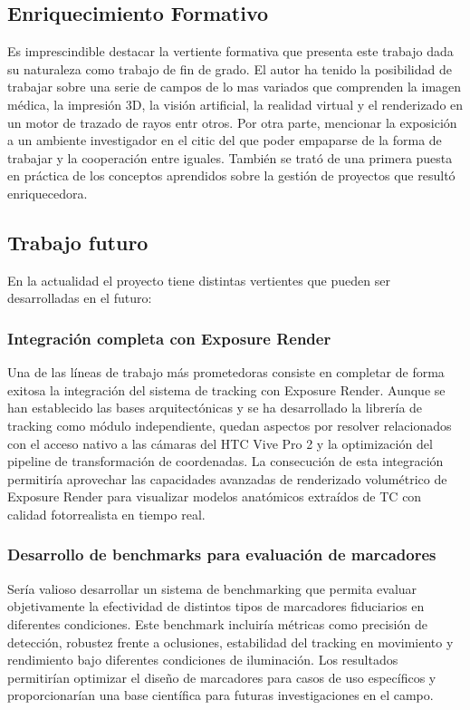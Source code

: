 \subsection{Enriquecimiento Formativo}
Es imprescindible destacar la vertiente formativa que presenta este trabajo dada su naturaleza como trabajo de fin de grado. El autor ha tenido la posibilidad de trabajar sobre una serie de campos de lo mas variados que comprenden la imagen médica, la impresión 3D, la visión artificial, la realidad virtual y el renderizado en un motor de trazado de rayos entr otros. Por otra parte, mencionar la exposición a un ambiente investigador en el \acrshort{citic} del que poder empaparse de la forma de trabajar y la cooperación entre iguales. También se trató de una primera puesta en práctica de los conceptos aprendidos sobre la gestión de proyectos que resultó enriquecedora.
\subsection{Trabajo futuro}
En la actualidad el proyecto tiene distintas vertientes que pueden ser desarrolladas en el futuro:

\subsubsection{Integración completa con Exposure Render}
Una de las líneas de trabajo más prometedoras consiste en completar de forma exitosa la integración del sistema de tracking con Exposure Render. Aunque se han establecido las bases arquitectónicas y se ha desarrollado la librería de tracking como módulo independiente, quedan aspectos por resolver relacionados con el acceso nativo a las cámaras del HTC Vive Pro 2 y la optimización del pipeline de transformación de coordenadas. La consecución de esta integración permitiría aprovechar las capacidades avanzadas de renderizado volumétrico de Exposure Render para visualizar modelos anatómicos extraídos de TC con calidad fotorrealista en tiempo real.

\subsubsection{Desarrollo de benchmarks para evaluación de marcadores}
Sería valioso desarrollar un sistema de benchmarking que permita evaluar objetivamente la efectividad de distintos tipos de marcadores fiduciarios en diferentes condiciones. Este benchmark incluiría métricas como precisión de detección, robustez frente a oclusiones, estabilidad del tracking en movimiento y rendimiento bajo diferentes condiciones de iluminación. Los resultados permitirían optimizar el diseño de marcadores para casos de uso específicos y proporcionarían una base científica para futuras investigaciones en el campo.

